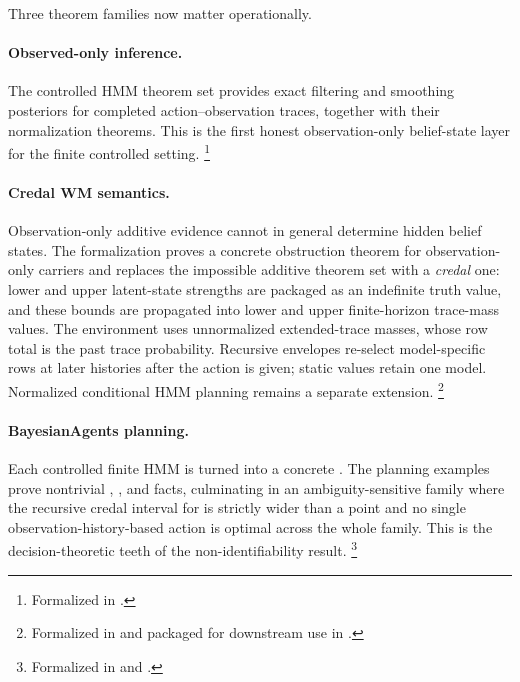 \documentclass[11pt,openany]{report}
\begin{document}
Three theorem families now matter operationally.

\paragraph{Observed-only inference.}
The controlled HMM theorem set provides exact filtering and smoothing
posteriors for completed action--observation traces, together with
their normalization theorems.  This is the first honest
observation-only belief-state layer for the finite controlled setting.%
\footnote{Formalized in
.}

\paragraph{Credal WM semantics.}
Observation-only additive evidence cannot in general determine hidden
belief states.  The formalization proves a concrete obstruction theorem
for observation-only carriers and replaces the impossible additive
theorem set with a \emph{credal} one: lower and upper latent-state
strengths are packaged as an indefinite truth value, and these bounds
are propagated into lower and upper finite-horizon trace-mass values.
The environment uses unnormalized extended-trace masses, whose row total is
the past trace probability. Recursive envelopes re-select model-specific rows
at later histories after the action is given; static values retain one model.
Normalized conditional HMM planning remains a separate extension.%
\footnote{Formalized in
and packaged for downstream use in
.}

\paragraph{BayesianAgents planning.}
Each controlled finite HMM is turned into a concrete
.  The planning examples prove
nontrivial , , and
 facts, culminating in an ambiguity-sensitive
family where the recursive credal interval for  is
strictly wider than a point and no single observation-history-based
action is optimal across the whole family.  This is the decision-theoretic
teeth of the non-identifiability result.%
\footnote{Formalized in
and
.}
\end{document}
